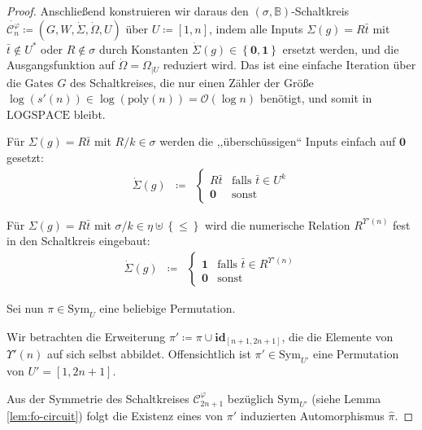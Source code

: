 \begin{proof}
Anschließend konstruieren wir daraus den $\left(\sigma,\mathbb{B}\right)$-Schaltkreis
$\dot{\mathcal{C}_{n}^{\varphi}}\coloneqq\left(G,W,\dot{\Sigma},\dot{\Omega},U\right)$
über $U\coloneqq\left[1,n\right]$, indem alle Inputs $\Sigma\left(g\right)=R\bar{t}$
mit $\bar{t}\notin U^{*}$ oder $R\notin\sigma$ durch Konstanten
$\dot{\Sigma}\left(g\right)\in\left\{ \mathbf{0},\mathbf{1}\right\} $
ersetzt werden, und die Ausgangsfunktion auf $\dot{\Omega}=\Omega_{\mid U}$
reduziert wird. Das ist eine einfache Iteration über die Gates $G$
des Schaltkreises, die nur einen Zähler der Größe $\log\left(s'\left(n\right)\right)\in\log\left(\mathrm{poly}\left(n\right)\right)=\mathcal{O}\left(\log n\right)$
benötigt, und somit in $\mathrm{LOGSPACE}$ bleibt.

\begin{casenv}
\item Für $\Sigma\left(g\right)=R\bar{t}$ mit $R/k\in\sigma$ werden die
,,überschüssigen`` Inputs einfach auf $\mathbf{0}$ gesetzt:
\begin{eqnarray*}
\dot{\Sigma}\left(g\right) & \coloneqq & \begin{cases}
R\bar{t} & \mathrm{falls}\,\,\bar{t}\in U^{k}\\
\mathbf{0} & \mathrm{sonst}
\end{cases}
\end{eqnarray*}
\item Für $\Sigma\left(g\right)=R\bar{t}$ mit $\sigma/k\in\eta\uplus\left\{ \leqslant\right\} $
wird die numerische Relation $R^{\Upsilon'\left(n\right)}$ fest in
den Schaltkreis eingebaut:
\begin{eqnarray*}
\dot{\Sigma}\left(g\right) & \coloneqq & \begin{cases}
\mathbf{1} & \mathrm{falls}\,\,\bar{t}\in R^{\Upsilon'\left(n\right)}\\
\mathbf{0} & \mathrm{sonst}
\end{cases}
\end{eqnarray*}
\end{casenv}
Sei nun $\pi\in\mathrm{Sym}_{U}$ eine beliebige Permutation.

Wir betrachten die Erweiterung $\pi'\coloneqq\pi\cup\mathbf{id}_{\left[n+1,2n+1\right]}$,
die die Elemente von $\Upsilon'\left(n\right)$ auf sich selbst abbildet.
Offensichtlich ist $\pi'\in\mathrm{Sym}_{U'}$ eine Permutation von
$U'=\left[1,2n+1\right]$.

Aus der Symmetrie des Schaltkreises $\mathcal{C}_{2n+1}^{\varphi}$
bezüglich $\mathrm{Sym}_{U'}$ (siehe Lemma \ref{lem:fo-circuit})
folgt die Existenz eines von $\pi'$ induzierten Automorphismus $\hat{\pi}$.


\end{proof}
